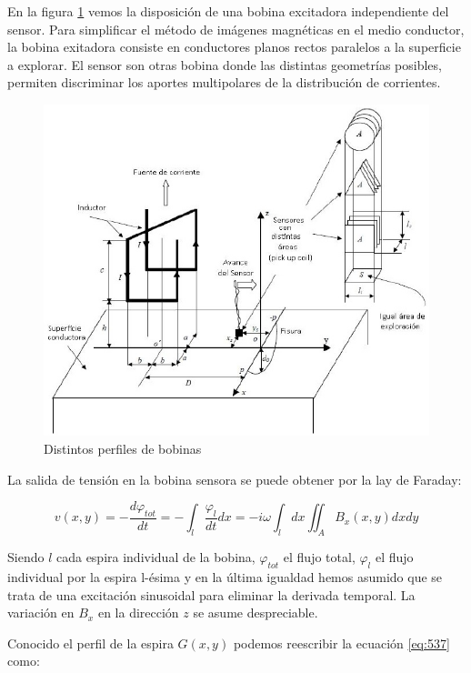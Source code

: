 En la figura \ref{fig:510} vemos la disposición de una bobina excitadora independiente del sensor. Para simplificar el método de imágenes magnéticas en el medio conductor, la bobina exitadora consiste en conductores planos rectos paralelos a la superficie a explorar. El sensor son otras bobina donde las distintas geometrías posibles, permiten discriminar los aportes multipolares de la distribución de corrientes.

\begin{figure}[H]
    \centering
    \includegraphics[width=1.0\textwidth]{./Figures/fig510}
	\caption{Distintos perfiles de bobinas}
	\label{fig:510}
\end{figure}

La salida de tensión en la bobina sensora se puede obtener por la lay de Faraday:

\begin{equation}
	\label{eq:537}
	v(x,y) = -\dfrac{d\varphi_{tot}}{dt}=-\int_{l}\dfrac{\varphi_{l}}{dt}dx=-i\omega\int_{l}dx\iint_{A}B_{x}(x,y)dxdy
\end{equation}

Siendo $l$ cada espira individual de la bobina, $\varphi_{tot}$ el flujo total, $\varphi_{l}$ el flujo individual por la espira l-ésima y en la última igualdad hemos asumido que se trata de una excitación sinusoidal para eliminar la derivada temporal. La variación en $B_{x}$ en la dirección $z$ se asume despreciable.

Conocido el perfil de la espira $G(x,y)$ podemos reescribir la ecuación \ref{eq:537} como:

